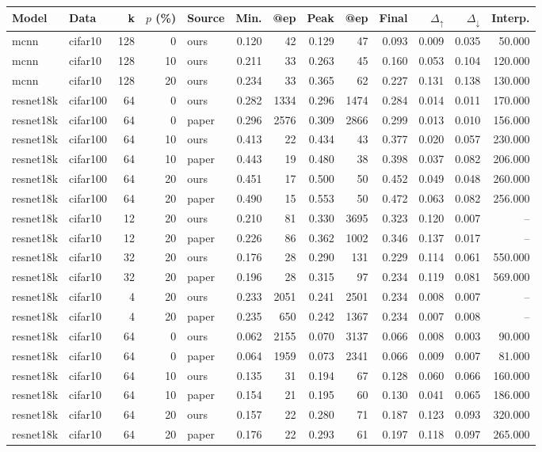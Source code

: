 \begin{tabular}{llrrlrrrrrrrr}
\toprule
Model & Data & k & $p$ (\%) & Source & Min. & @ep & Peak & @ep  & Final & $\Delta_{\uparrow}$ & $\Delta_{\downarrow}$ & Interp. \\
\midrule
mcnn & cifar10 & 128 & 0 & ours & 0.120 & 42 & 0.129 & 47 & 0.093 & 0.009 & 0.035 & 50.000 \\
mcnn & cifar10 & 128 & 10 & ours & 0.211 & 33 & 0.263 & 45 & 0.160 & 0.053 & 0.104 & 120.000 \\
mcnn & cifar10 & 128 & 20 & ours & 0.234 & 33 & 0.365 & 62 & 0.227 & 0.131 & 0.138 & 130.000 \\
resnet18k & cifar100 & 64 & 0 & ours & 0.282 & 1334 & 0.296 & 1474 & 0.284 & 0.014 & 0.011 & 170.000 \\
resnet18k & cifar100 & 64 & 0 & paper & 0.296 & 2576 & 0.309 & 2866 & 0.299 & 0.013 & 0.010 & 156.000 \\
resnet18k & cifar100 & 64 & 10 & ours & 0.413 & 22 & 0.434 & 43 & 0.377 & 0.020 & 0.057 & 230.000 \\
resnet18k & cifar100 & 64 & 10 & paper & 0.443 & 19 & 0.480 & 38 & 0.398 & 0.037 & 0.082 & 206.000 \\
resnet18k & cifar100 & 64 & 20 & ours & 0.451 & 17 & 0.500 & 50 & 0.452 & 0.049 & 0.048 & 260.000 \\
resnet18k & cifar100 & 64 & 20 & paper & 0.490 & 15 & 0.553 & 50 & 0.472 & 0.063 & 0.082 & 256.000 \\
resnet18k & cifar10 & 12 & 20 & ours & 0.210 & 81 & 0.330 & 3695 & 0.323 & 0.120 & 0.007 & -- \\
resnet18k & cifar10 & 12 & 20 & paper & 0.226 & 86 & 0.362 & 1002 & 0.346 & 0.137 & 0.017 & -- \\
resnet18k & cifar10 & 32 & 20 & ours & 0.176 & 28 & 0.290 & 131 & 0.229 & 0.114 & 0.061 & 550.000 \\
resnet18k & cifar10 & 32 & 20 & paper & 0.196 & 28 & 0.315 & 97 & 0.234 & 0.119 & 0.081 & 569.000 \\
resnet18k & cifar10 & 4 & 20 & ours & 0.233 & 2051 & 0.241 & 2501 & 0.234 & 0.008 & 0.007 & -- \\
resnet18k & cifar10 & 4 & 20 & paper & 0.235 & 650 & 0.242 & 1367 & 0.234 & 0.007 & 0.008 & -- \\
resnet18k & cifar10 & 64 & 0 & ours & 0.062 & 2155 & 0.070 & 3137 & 0.066 & 0.008 & 0.003 & 90.000 \\
resnet18k & cifar10 & 64 & 0 & paper & 0.064 & 1959 & 0.073 & 2341 & 0.066 & 0.009 & 0.007 & 81.000 \\
resnet18k & cifar10 & 64 & 10 & ours & 0.135 & 31 & 0.194 & 67 & 0.128 & 0.060 & 0.066 & 160.000 \\
resnet18k & cifar10 & 64 & 10 & paper & 0.154 & 21 & 0.195 & 60 & 0.130 & 0.041 & 0.065 & 186.000 \\
resnet18k & cifar10 & 64 & 20 & ours & 0.157 & 22 & 0.280 & 71 & 0.187 & 0.123 & 0.093 & 320.000 \\
resnet18k & cifar10 & 64 & 20 & paper & 0.176 & 22 & 0.293 & 61 & 0.197 & 0.118 & 0.097 & 265.000 \\
\bottomrule
\end{tabular}
